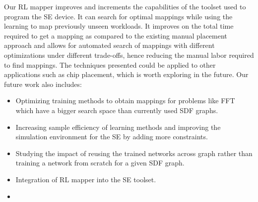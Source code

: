 Our RL mapper improves and increments the capabilities of the toolset used to program the SE device. 
It can search for optimal mappings while using the learning to map previously unseen workloads. 
It improves on the total time required to get a mapping as compared to the existing manual placement approach and allows for automated search of mappings with different optimizations under different trade-offs, hence reducing the manual labor required to find mappings. 
The techniques presented could be applied to other applications such as chip placement, which is worth exploring in the future. 
Our future work also includes: 
\begin{itemize}
    \item Optimizing training methods to obtain mappings for problems like FFT which have a bigger search space than currently used SDF graphs. 
    \item Increasing sample efficiency of learning methods and improving the simulation environment for the SE by adding more constraints. 
    \item Studying the impact of reusing the trained networks across graph rather than training a network from scratch for a given SDF graph.
    \item Integration of RL mapper into the SE toolset.
    \item {}
\end{itemize}